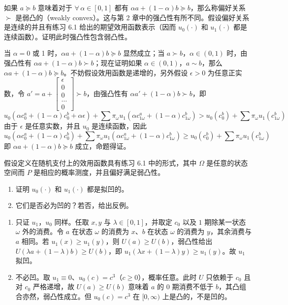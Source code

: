 \begin{problem}
 如果 $a\succeq b$ 意味着对于 $\forall\,\alpha\in[0,1]$ 都有 $\alpha a+(1-\alpha)b\succeq b$，那么称偏好关系 $\succ$ 是弱凸的（weakly convex）。这与第 2 章中的强凸性有所不同。假设偏好关系是连续的并且有练习 6.1 给出的期望效用函数表示（因而 $u_{0}(\cdot)$ 和 $u_{1}(\cdot)$ 都是连续函数）。证明此时强凸性包含弱凸性。
\end{problem}
\begin{solution}
当 $\alpha=0$ 或 1 时，$\alpha a+(1-\alpha)b\succeq b$ 显然成立；当 $a\succ b$，$\alpha\in(0,1)$ 时，由强凸性有 $\alpha a+(1-\alpha)b\succ b$；现在证明如果 $\alpha\in(0,1)$，$a\sim b$，那么 $\alpha a+(1-\alpha)b\succeq b$。不妨假设效用函数是递增的，另外假设 $\epsilon>0$ 为任意正实数，令 $a'=a+\begin{bmatrix}\epsilon \\ 0 \\ 0 \\ \ldots \\ 0\end{bmatrix}\succ b$，由强凸性有 $\alpha a'+(1-\alpha)b\succ b$，即
\[
    u_{0}(\alpha c_{0}^{a}+(1-\alpha)c_{0}^{b}+\alpha\epsilon)+\sum\pi_{\omega}u_{1}(\alpha c_{1\omega}^{a}+(1-\alpha)c_{1\omega}^{b})>u_{0}(c_{0}^{b})+\sum\pi_{\omega}u_{1}(c_{1\omega}^{b})
\]
由于 $\epsilon$ 是任意实数，并且 $u_{0}$ 是连续函数，因此
\[
    u_{0}(\alpha c_{0}^{a}+(1-\alpha)c_{0}^{b})+\sum\pi_{\omega}u_{1}(\alpha c_{1\omega}^{a}+(1-\alpha)c_{1\omega}^{b})\ge u_{0}(c_{0}^{b})+\sum\pi_{\omega}u_{1}(c_{1\omega}^{b})
\]
即 $\alpha a+(1-\alpha)b\succeq b$ 成立，命题得证。
\end{solution}

\begin{problem}
 假设定义在随机支付上的效用函数具有练习 6.1 中的形式，其中 $\Omega$ 是任意的状态空间而 $P$ 是相应的概率测度，并且偏好满足弱凸性。
\begin{enumerate}[label=(\alph*)]
    \item 证明 $u_{0}(\cdot)$ 和 $u_{1}(\cdot)$ 都是拟凹的。
    \item 它们是否必为凹的？若否，给出反例。
\end{enumerate}
\end{problem}
\begin{solution}
\begin{enumerate}[label=(\alph*)]
    \item 只证 $u_{1}$，$u_{0}$ 同样。任取 $x,y$ 与 $\lambda\in[0,1]$，并取定 $c_{0}$ 以及 $1$ 期除某一状态 $\omega$ 外的消费。令 $a$ 在状态 $\omega$ 的消费为 $x$、$b$ 在状态 $\omega$ 的消费为 $y$，其余消费与 $a$ 相同。若 $u_{1}(x)\ge u_{1}(y)$，则 $U(a)\ge U(b)$，弱凸性给出 $U(\lambda a+(1-\lambda)b)\ge U(b)$，即 $u_{1}(\lambda x+(1-\lambda)y)\ge u_{1}(y)$。故 $u_{1}$ 拟凹。
    \item 不必凹。取 $u_{1}\equiv 0$、$u_{0}(c)=c^{3}$（$c\ge 0$），概率任意。此时 $U$ 只依赖于 $c_{0}$ 且对 $c_{0}$ 严格递增，故 $U(a)\ge U(b)$ 意味着 $a$ 的 $0$ 期消费不低于 $b$，其凸组合亦然，弱凸性成立。但 $u_{0}(c)=c^{3}$ 在 $[0,\infty)$ 上是凸的，不是凹的。
\end{enumerate}
\end{solution}

